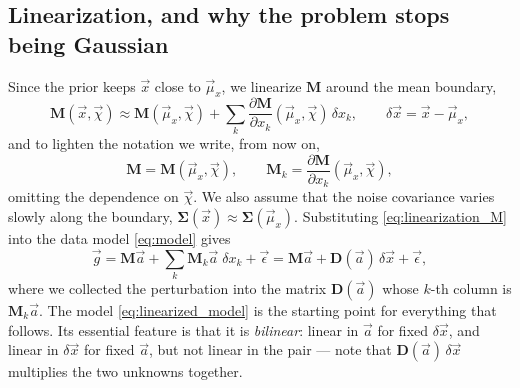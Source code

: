\documentclass{article}
\begin{document}
\subsection{Linearization, and why the problem stops being Gaussian} \label{sec:linearization}
Since the prior keeps $\vec x$ close to $\vec\mu_x$, we linearize $\mathbf{M}$ around the mean boundary,
\begin{equation} \label{eq:linearization_M}
    \mathbf{M}(\vec{x},\vec{\chi}) \approx \mathbf{M}(\vec{\mu}_x,\vec{\chi}) + \sum_k \frac{\partial \mathbf{M}}{\partial x_k}(\vec{\mu}_x,\vec{\chi})\, \delta x_k, \qquad \delta \vec{x} = \vec{x} - \vec{\mu}_x,
\end{equation}
and to lighten the notation we write, from now on,
\begin{equation}
    \mathbf M = \mathbf M(\vec{\mu}_x, \vec\chi), \qquad \mathbf M_k = \frac{\partial \mathbf{M}}{\partial x_k}(\vec{\mu}_x, \vec\chi),
\end{equation}
omitting the dependence on $\vec\chi$. We also assume that the noise covariance varies slowly along the boundary, $\mathbf{\Sigma}(\vec{x})\approx \mathbf{\Sigma}(\vec{\mu}_x)$. Substituting \eqref{eq:linearization_M} into the data model \eqref{eq:model} gives
\begin{equation}
    \vec{g} = \mathbf{M}\vec{a} + \sum_k \mathbf{M}_k \vec a\; \delta x_k + \vec{\epsilon}
    = \mathbf{M}\vec{a} + \mathbf{D}(\vec a)\,\delta\vec x + \vec{\epsilon}, \label{eq:linearized_model}
\end{equation}
where we collected the perturbation into the matrix $\mathbf{D}(\vec{a})$ whose $k$-th column is $\mathbf{M}_k \vec{a}$. The model \eqref{eq:linearized_model} is the starting point for everything that follows. Its essential feature is that it is \emph{bilinear}: linear in $\vec a$ for fixed $\delta\vec x$, and linear in $\delta \vec x$ for fixed $\vec a$, but not linear in the pair --- note that $\mathbf D(\vec a)\,\delta\vec x$ multiplies the two unknowns together.
\end{document}
